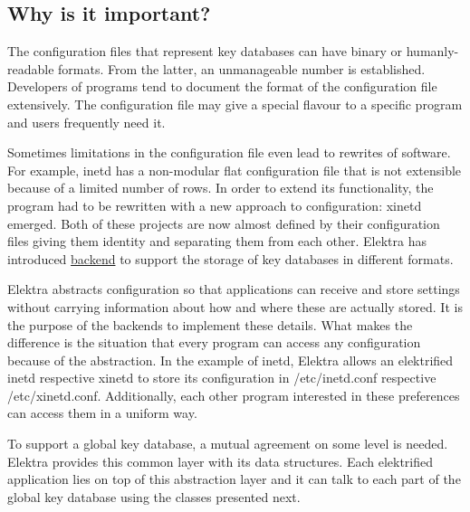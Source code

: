 \subsection*{Why is it important?}

The configuration files that represent key databases can have binary or humanly-\/readable formats. From the latter, an unmanageable number is established. Developers of programs tend to document the format of the configuration file extensively. The configuration file may give a special flavour to a specific program and users frequently need it.

Sometimes limitations in the configuration file even lead to rewrites of software. For example, inetd has a non-\/modular flat configuration file that is not extensible because of a limited number of rows. In order to extend its functionality, the program had to be rewritten with a new approach to configuration\+: xinetd emerged. Both of these projects are now almost defined by their configuration files giving them identity and separating them from each other. Elektra has introduced \hyperlink{md_doc_help_elektra-backends_doc_help_elektra-backends_md}{backend} to support the storage of key databases in different formats.

Elektra abstracts configuration so that applications can receive and store settings without carrying information about how and where these are actually stored. It is the purpose of the backends to implement these details. What makes the difference is the situation that every program can access any configuration because of the abstraction. In the example of inetd, Elektra allows an elektrified inetd respective xinetd to store its configuration in /etc/inetd.conf respective /etc/xinetd.conf. Additionally, each other program interested in these preferences can access them in a uniform way.

To support a global key database, a mutual agreement on some level is needed. Elektra provides this common layer with its data structures. Each elektrified application lies on top of this abstraction layer and it can talk to each part of the global key database using the classes presented next. 